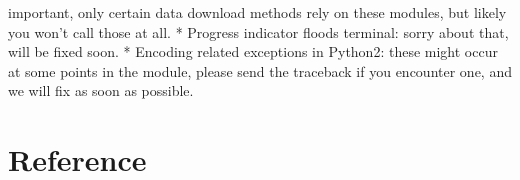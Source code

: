 \documentclass[letterpaper,10pt,english]{sphinxmanual}
\begin{document}
important, only certain data download methods rely on these modules, but
likely you won’t call those at all.
* Progress indicator floods terminal: sorry about that, will be fixed soon.
* Encoding related exceptions in Python2: these might occur at some points in
the module, please send the traceback if you encounter one, and we will fix
as soon as possible.



\chapter{Reference}
\label{\detokenize{main:module-pypath.main}}\label{\detokenize{main:reference}}\label{\detokenize{main::doc}}
\end{document}
